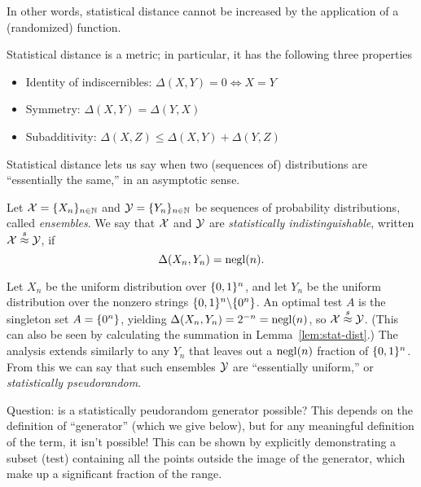 \documentclass[11pt]{article}
\begin{document}
In other words, statistical distance cannot be increased by the application
of a (randomized) function.

\begin{lemma}
  Statistical distance is a metric; in particular, it has the following three
  properties
  \begin{itemize}
      \item Identity of indiscernibles: $\Delta(X,Y) = 0 \iff X = Y$
      \item Symmetry: $\Delta(X,Y) = \Delta(Y,X)$
      \item Subadditivity: $\Delta(X,Z) \leq \Delta(X,Y) + \Delta(Y, Z)$
  \end{itemize}
\end{lemma}

Statistical distance lets us say when two (sequences of) distributions
are ``essentially the same,'' in an asymptotic sense.

\begin{definition}
  \label{def:stat-ind}
  Let $\mathcal{X} = \{X_{n}\}_{n \in \mathbb{N}}$ and $\mathcal{Y} = \{Y_{n}\}_{n \in
    \mathbb{N}}$ be sequences of probability distributions, called
  \emph{ensembles}.  We say that $\mathcal{X}$ and $\mathcal{Y}$ are
  \emph{statistically indistinguishable}, written $\mathcal{X} \stackrel{s}{\approx}
  \mathcal{Y}$, if \[ \Delta(X_{n}, Y_{n}) = \operatorname{negl}(n). \]
\end{definition}

\begin{example}
  Let $X_{n}$ be the uniform distribution over $\{0,1\}^{n}$, and let
  $Y_{n}$ be the uniform distribution over the nonzero strings
  $\{0,1\}^{n} \backslash \{0^{n}\}$.  An optimal test $A$ is the
  singleton set $A = \{0^{n}\}$, yielding $\Delta(X_{n}, Y_{n}) =
  2^{-n} = \operatorname{negl}(n)$, so $\mathcal{X} \stackrel{s}{\approx} \mathcal{Y}$.  (This can also be
  seen by calculating the summation in Lemma~\ref{lem:stat-dist}.)
  The analysis extends similarly to any $Y_{n}$ that leaves out a
  $\operatorname{negl}(n)$ fraction of $\{0,1\}^{n}$.  From this we can say that such
  ensembles $\mathcal{Y}$ are ``essentially uniform,'' or
  \emph{statistically pseudorandom}.
\end{example}

Question: is a statistically peudorandom generator possible?  This
depends on the definition of ``generator'' (which we give below), but
for any meaningful definition of the term, it isn't possible!  This
can be shown by explicitly demonstrating a subset (test) containing
all the points outside the image of the generator, which make up a
significant fraction of the range.
\end{document}
